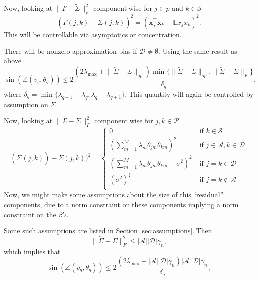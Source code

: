 \documentclass[11pt]{article}
\newcommand{\E}{\mathbb{E}}
\newcommand{\norm}[1]{\lVert #1 \rVert}
\newcommand{\A}{\mathcal{A}}
\renewcommand{\S}{\mathcal{S}}
\newcommand{\D}{\mathcal{D}}
\newcommand{\x}{\mathbf{x}}
\newcommand{\PP}{\mathcal{P}}
\begin{document}
Now, looking at $\norm{F - \tilde{\Sigma}}_{F}^2$ component wise for $j \in p$ and $k \in \S$
\begin{equation}
(F(j,k) - \tilde{\Sigma}(j,k))^2 = (\x_j^{\top}\x_k - \E x_jx_k)^2.
\end{equation}
This will be controllable via asymptotics or concentration. 

There will be nonzero approximation bias if $\D \neq \emptyset$.  Using the same result as above
\begin{equation}
\sin(\angle (v_q,\theta_q))
\leq 
2\frac{(2\lambda_{\max} + \norm{ \tilde{\Sigma} - \Sigma}_{op})\min\{\norm{\tilde{\Sigma} - \Sigma}_{op}, \norm{\tilde{\Sigma} - \Sigma}_{F}\}}{\delta_q},
\end{equation}
where $\delta_q = \min\{\lambda_{q-1} - \lambda_q, \lambda_{q} - \lambda_{q+1}\}$.  This quantity will again be controlled by assumption on $\Sigma$. 

Now, looking at $\norm{\tilde{\Sigma} - \Sigma}_{F}^2$ component wise for $j,k \in \PP$
\begin{equation}
( \tilde{\Sigma}(j,k)) - \Sigma(j,k))^2 
= 
\begin{cases}
0 & \textrm{ if } k \in \S \\
(\sum_{m = 1}^M \lambda_m \theta_{jm} \theta_{km})^2  & \textrm{ if } j \in \A,k \in \D \\
(\sum_{m = 1}^M \lambda_m \theta_{jm} \theta_{km}  + \sigma^2)^2 & \textrm{ if } j = k \in \D \\
(\sigma^2)^2 & \textrm{ if } j = k \notin \A \\
\end{cases}
\end{equation}
Now, we might make some assumptions about the size of this ``residual'' components, due to a norm constraint on these components implying a norm constraint on the $\beta$'s. 

Some such assumptions are listed in Section \ref{sec:assumptions}. Then
\begin{equation}
\norm{\tilde{\Sigma} - \Sigma}_{F}^2 \leq |\A||\D|\gamma_n,
\label{eq:residualC3}
\end{equation}
which implies that
\begin{equation}
\sin(\angle (v_q,\theta_q))
\leq 
2\frac{(2\lambda_{\max} + |\A||\D|\gamma_n)|\A||\D|\gamma_n}{\delta_q},
\end{equation}
\end{document}
